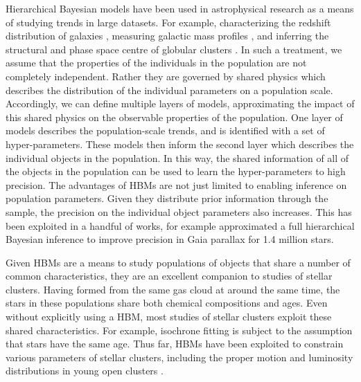 \documentclass[fleqn,usenatbib]{mnras}
\begin{document}
Hierarchical Bayesian models have been used in astrophysical research as a means of studying trends in large datasets. For example, characterizing the redshift distribution of galaxies \citep{2016MNRAS.460.4258L}, measuring galactic mass profiles \citep{2015ApJ...806...54E, 2018ApJ...865...72E}, and inferring the structural and phase space centre of globular clusters \citep{2024MNRAS.527.4193W}. In such a treatment, we assume that the properties of the individuals in the population are not completely independent. Rather they are governed by shared physics which describes the distribution of the individual parameters on a population scale. Accordingly, we can define multiple layers of models, approximating the impact of this shared physics on the observable properties of the population. One layer of models describes the population-scale trends, and is identified with a set of hyper-parameters. These models then inform the second layer which describes the individual objects in the population. In this way, the shared information of all of the objects in the population can be used to learn the hyper-parameters to high precision. The advantages of HBMs are not just limited to enabling inference on population parameters. Given they distribute prior information through the sample, the precision on the individual object parameters also increases. This has been exploited in a handful of works, for example \citet{2018AJ....156..145A} approximated a full hierarchical Bayesian inference to improve precision in Gaia parallax for 1.4 million stars.


Given HBMs are a means to study populations of objects that share a number of common characteristics, they are an excellent companion to studies of stellar clusters. Having formed from the same gas cloud at around the same time, the stars in these populations share both chemical compositions and ages. Even without explicitly using a HBM, most studies of stellar clusters exploit these shared characteristics. For example, isochrone fitting is subject to the assumption that stars have the same age. Thus far, HBMs have been exploited to constrain various parameters of stellar clusters, including the proper motion and luminosity distributions in young open clusters \citep{2018A&A...617A..15O, 2021A&A...649A.159O}. 
\end{document}
